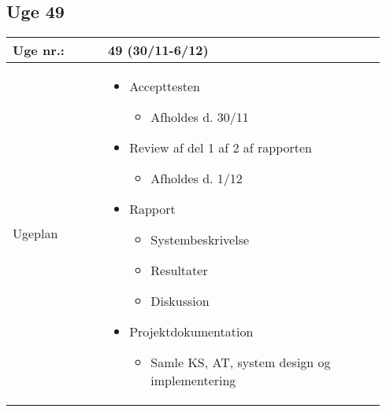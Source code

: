 	\subsection{Uge 49}
	\begin{longtable}{|p{0.24\linewidth}|p{0.7\linewidth}|}
		\hline
		Uge nr.: & 49 (30/11-6/12)\\ \hline
		Ugeplan & 
		\begin{itemize}
			\item Accepttesten 
			\begin{itemize}
				\item Afholdes d. 30/11
			\end{itemize}
			\item Review af del 1 af 2 af rapporten
			\begin{itemize}
				\item Afholdes d. 1/12
			\end{itemize}
			\item Rapport
			\begin{itemize}
				\item Systembeskrivelse 
				\item Resultater
				\item Diskussion
			\end{itemize}
			\item Projektdokumentation
			\begin{itemize}
				\item Samle KS, AT, system design og implementering 
			\end{itemize}
		\end{itemize}
		

\end{longtable}
